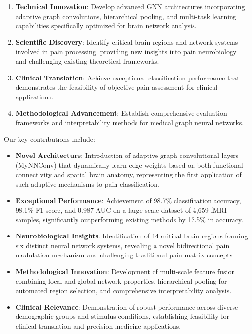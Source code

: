 \documentclass[10pt,journal,compsoc]{IEEEtran}
\begin{document}
\begin{enumerate}[label=(\arabic*)]
\item \textbf{Technical Innovation}: Develop advanced GNN architectures incorporating adaptive graph convolutions, hierarchical pooling, and multi-task learning capabilities specifically optimized for brain network analysis.

\item \textbf{Scientific Discovery}: Identify critical brain regions and network systems involved in pain processing, providing new insights into pain neurobiology and challenging existing theoretical frameworks.

\item \textbf{Clinical Translation}: Achieve exceptional classification performance that demonstrates the feasibility of objective pain assessment for clinical applications.

\item \textbf{Methodological Advancement}: Establish comprehensive evaluation frameworks and interpretability methods for medical graph neural networks.
\end{enumerate}

Our key contributions include:

\begin{itemize}
\item \textbf{Novel Architecture}: Introduction of adaptive graph convolutional layers (MyNNConv) that dynamically learn edge weights based on both functional connectivity and spatial brain anatomy, representing the first application of such adaptive mechanisms to pain classification.

\item \textbf{Exceptional Performance}: Achievement of 98.7\% classification accuracy, 98.1\% F1-score, and 0.987 AUC on a large-scale dataset of 4,659 fMRI samples, significantly outperforming existing methods by 13.5\% in accuracy.

\item \textbf{Neurobiological Insights}: Identification of 14 critical brain regions forming six distinct neural network systems, revealing a novel bidirectional pain modulation mechanism and challenging traditional pain matrix concepts.

\item \textbf{Methodological Innovation}: Development of multi-scale feature fusion combining local and global network properties, hierarchical pooling for automated region selection, and comprehensive interpretability analysis.

\item \textbf{Clinical Relevance}: Demonstration of robust performance across diverse demographic groups and stimulus conditions, establishing feasibility for clinical translation and precision medicine applications.
\end{itemize}
\end{document}
